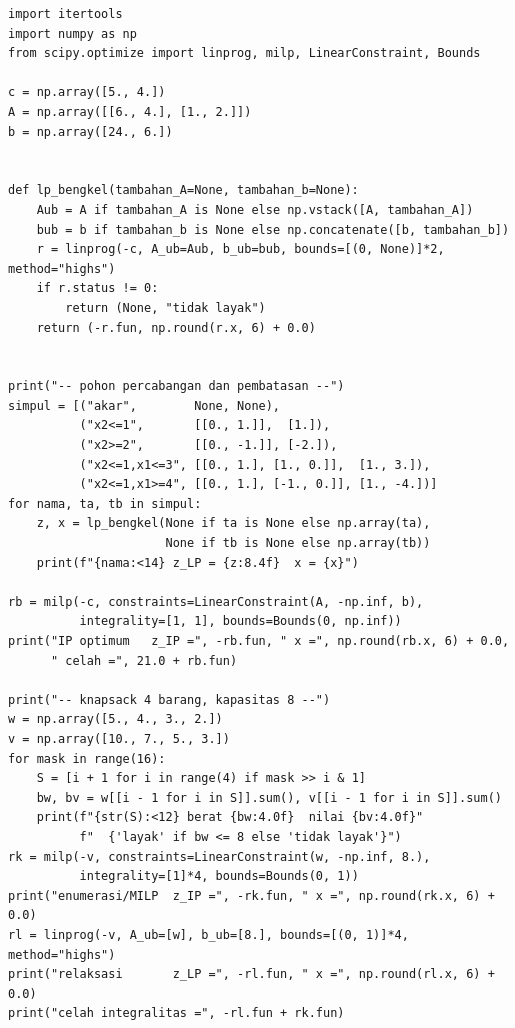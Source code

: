 \begin{lab}
\begin{verbatim}
import itertools
import numpy as np
from scipy.optimize import linprog, milp, LinearConstraint, Bounds

c = np.array([5., 4.])
A = np.array([[6., 4.], [1., 2.]])
b = np.array([24., 6.])


def lp_bengkel(tambahan_A=None, tambahan_b=None):
    Aub = A if tambahan_A is None else np.vstack([A, tambahan_A])
    bub = b if tambahan_b is None else np.concatenate([b, tambahan_b])
    r = linprog(-c, A_ub=Aub, b_ub=bub, bounds=[(0, None)]*2, method="highs")
    if r.status != 0:
        return (None, "tidak layak")
    return (-r.fun, np.round(r.x, 6) + 0.0)


print("-- pohon percabangan dan pembatasan --")
simpul = [("akar",        None, None),
          ("x2<=1",       [[0., 1.]],  [1.]),
          ("x2>=2",       [[0., -1.]], [-2.]),
          ("x2<=1,x1<=3", [[0., 1.], [1., 0.]],  [1., 3.]),
          ("x2<=1,x1>=4", [[0., 1.], [-1., 0.]], [1., -4.])]
for nama, ta, tb in simpul:
    z, x = lp_bengkel(None if ta is None else np.array(ta),
                      None if tb is None else np.array(tb))
    print(f"{nama:<14} z_LP = {z:8.4f}  x = {x}")

rb = milp(-c, constraints=LinearConstraint(A, -np.inf, b),
          integrality=[1, 1], bounds=Bounds(0, np.inf))
print("IP optimum   z_IP =", -rb.fun, " x =", np.round(rb.x, 6) + 0.0,
      " celah =", 21.0 + rb.fun)

print("-- knapsack 4 barang, kapasitas 8 --")
w = np.array([5., 4., 3., 2.])
v = np.array([10., 7., 5., 3.])
for mask in range(16):
    S = [i + 1 for i in range(4) if mask >> i & 1]
    bw, bv = w[[i - 1 for i in S]].sum(), v[[i - 1 for i in S]].sum()
    print(f"{str(S):<12} berat {bw:4.0f}  nilai {bv:4.0f}"
          f"  {'layak' if bw <= 8 else 'tidak layak'}")
rk = milp(-v, constraints=LinearConstraint(w, -np.inf, 8.),
          integrality=[1]*4, bounds=Bounds(0, 1))
print("enumerasi/MILP  z_IP =", -rk.fun, " x =", np.round(rk.x, 6) + 0.0)
rl = linprog(-v, A_ub=[w], b_ub=[8.], bounds=[(0, 1)]*4, method="highs")
print("relaksasi       z_LP =", -rl.fun, " x =", np.round(rl.x, 6) + 0.0)
print("celah integralitas =", -rl.fun + rk.fun)


\end{verbatim}
\end{lab}
